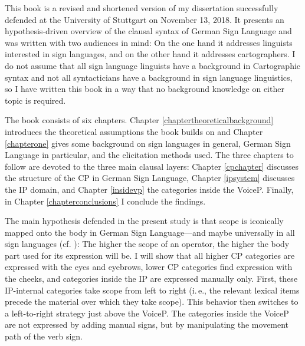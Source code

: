 

\begin{refsection}

This book is a revised and shortened version of my dissertation successfully defended at the University of Stuttgart on November 13, 2018. It presents an hypothesis-driven overview of the clausal syntax of German Sign Language and was written with two audiences in mind: On the one hand it addresses linguists interested in sign languages, and on the other hand it addresses cartographers. I do not assume that all sign language linguists have a background in Cartographic syntax and not all syntacticians have a background in sign language linguistics, so I have written this book in a way that no background knowledge on either topic is required.

The book consists of six chapters. Chapter \ref{chaptertheoreticalbackground} introduces the theoretical assumptions the book builds on and Chapter \ref{chapterone} gives some background on sign languages in general, German Sign Language in particular, and the elicitation methods used. The three chapters to follow are devoted to the three main clausal layers: Chapter \ref{cpchapter} discusses the structure of the CP in German Sign Language, Chapter \ref{ipsystem} discusses the IP domain, and Chapter \ref{insidevp} the categories inside the VoiceP. Finally, in Chapter \ref{chapterconclusions} I conclude the findings.

The main hypothesis defended in the present study is that scope is iconically mapped onto the body in German Sign Language---and maybe universally in all sign languages (cf. \citealt{bross2017scope}): The higher the scope of an operator, the higher the body part used for its expression will be. I will show that all higher CP categories are expressed with the eyes and eyebrows, lower CP categories find expression with the cheeks, and categories inside the IP are expressed manually only. First, these IP-internal categories take scope from left to right (i.\,e., the relevant lexical items precede the material over which they take scope). This behavior then switches to a left-to-right strategy just above the VoiceP. The categories inside the VoiceP are not expressed by adding manual signs, but by manipulating the movement path of the verb sign. 

\end{refsection}